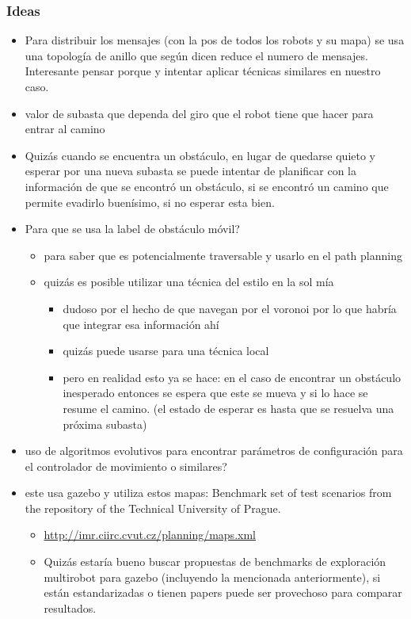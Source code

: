 \subsubsection{Ideas}
\begin{itemize}
\item Para distribuir los mensajes (con la pos de todos los robots y su mapa) se usa una topología de anillo que según dicen reduce el numero de mensajes. Interesante pensar porque y intentar aplicar técnicas similares en nuestro caso.

\item valor de subasta que dependa del giro que el robot tiene que hacer para entrar al camino

\item Quizás cuando se encuentra un obstáculo, en lugar de quedarse quieto y esperar por una nueva subasta se puede intentar de planificar con la información de que se encontró un obstáculo, si se encontró un camino que permite evadirlo buenísimo, si no esperar esta bien.

\item Para que se usa la label de obstáculo móvil?
\begin{itemize}
  \item para saber que es potencialmente traversable y usarlo en el path planning
  \item quizás es posible utilizar una técnica del estilo en la sol mía
  \begin{itemize}
    \item dudoso por el hecho de que navegan por el voronoi por lo que habría que integrar esa información ahí
    \item quizás puede usarse para una técnica local 
    \item pero en realidad esto ya se hace: en el caso de encontrar un obstáculo inesperado entonces se espera que este se mueva y si lo hace se resume el camino. (el estado de esperar es hasta que se resuelva una próxima subasta)
  \end{itemize}
\end{itemize}

\item uso de algoritmos evolutivos para encontrar parámetros de configuración para el controlador de movimiento o similares?

\item este usa gazebo y utiliza estos mapas: Benchmark set of test scenarios from the repository of the Technical University of Prague.
\begin{itemize}
  \item \url{http://imr.ciirc.cvut.cz/planning/maps.xml}
  \item Quizás estaría bueno buscar propuestas de benchmarks de exploración multirobot para gazebo (incluyendo la mencionada anteriormente), si están estandarizadas o tienen papers puede ser provechoso para comparar resultados.
\end{itemize}


\end{itemize}
